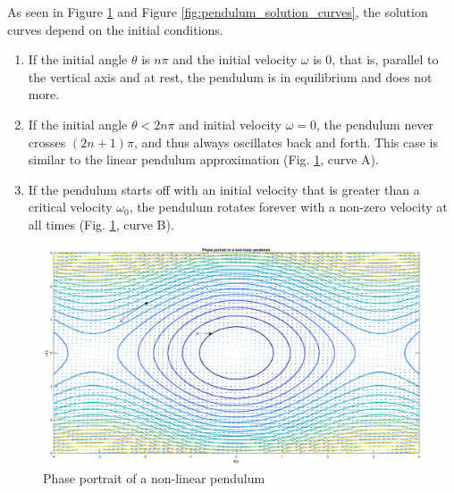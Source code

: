 \documentclass[11pt,1in]{article}
\begin{document}
As seen in Figure \ref{fig:pendulum_phase} and Figure \ref{fig:pendulum_solution_curves}, the solution curves depend on the initial conditions. 
\begin{enumerate}
	\item If the initial angle $\theta$ is $n\pi$ and the initial velocity $\omega$ is $0$, that is, parallel to the vertical axis and at rest, the pendulum is in equilibrium and does not more. 
	\item If the initial angle $\theta < 2n\pi$ and initial velocity $\omega = 0$, the pendulum never crosses $(2n + 1)\pi$, and thus always oscillates back and forth. This case is similar to the linear pendulum approximation (Fig. \ref{fig:pendulum_phase}, curve A). 
	\item If the pendulum starts off with an initial velocity that is greater than a critical velocity $\omega_0$, the pendulum rotates forever with a non-zero velocity at all times (Fig. \ref{fig:pendulum_phase}, curve B).
\end{enumerate}

\begin{figure}[H]
	\centering
	\includegraphics[trim={2in 0 1.5in 0}, width=\linewidth]{Figures/pendulum_phase}
	\caption{Phase portrait of a non-linear pendulum}
	\label{fig:pendulum_phase}
\end{figure}
\end{document}
